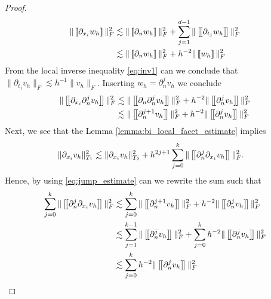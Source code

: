\begin{proof}
\begin{equation}
    \begin{split}
   \| \jump{ \partial _{x_{i}} w_{h} }   \|_{F  }^{2  } & \lesssim \| \jump{ \partial _{n} w_{h} }   \|_{F  }^{ 2 } + \sum_{j=1}^{d-1} \| \jump{ \partial _{t_{j}} w_{h} }   \|_{ F }^{ 2 } \\
    & \lesssim \| \jump{ \partial _{n} w_{h} }   \|_{F  }^{ 2 } +  h^{-2} \| \jump{ w_{h} }   \|_{ F }^{ 2 }
    \end{split}
\end{equation}
From the local inverse inequality \eqref{eq:inv1} can we conclude that $\| \partial _{t_{j}} v_{h} \|_{F  }^{  } \lesssim h^{-1} \|  v_{h} \|_{F  }^{  }  $.
Inserting $w_{h} = \partial ^{j} _{n} v_{h}$ we conclude
\begin{equation}
    \label{eq:jump_estimate}
    \begin{split}
   \| \jump{ \partial _{x_{i}} \partial ^{j} _{n} v_{h} }   \|_{F  }^{2  } & \lesssim \| \jump{ \partial _{n} \partial ^{j} _{n} v_{h} }   \|_{F  }^{ 2 } +  h^{-2} \| \jump{ \partial ^{j} _{n} v_{h} }   \|_{ F }^{ 2 } \\
                                                                           & \lesssim \| \jump{  \partial ^{j+1} _{n} v_{h} }   \|_{F  }^{ 2 } +  h^{-2} \| \jump{ \partial ^{j} _{n} v_{h} }   \|_{ F }^{ 2 } \\
    \end{split}
\end{equation}
Next, we see that the Lemma \ref{lemma:bi_local_facet_estimate} implies
\begin{equation}
    \label{eq:ghost_estimate:1}
    \begin{split}
    \| \partial _{x_{i}} v_{h} \|_{  T_{1}}^{2  } & \lesssim \| \partial _{x_{i}} v_{h} \|_{ T_{2} }^{  2} + h^{2j+1}\sum_{j=0}^{k} \| \left[\!\left[  \partial _{n}^{j} \partial _{x_{i}} v_{h}  \right]\!\right]   \|_{F  }^{2  }.
    \end{split}
\end{equation}
Hence, by using \eqref{eq:jump_estimate} can we rewrite the sum such that
\begin{equation}
    \label{eq:ghost_estimate:2}
    \begin{split}
                                                  \sum_{j=0}^{k} \| \jump{ \partial _{n}^{j} \partial _{x_{i}} v_{h} }   \|_{F  }^{2  } & \lesssim  \sum_{j=0}^{k} \| \jump{  \partial ^{j+1} _{n} v_{h} }   \|_{F  }^{ 2 } +  h^{-2} \| \jump{ \partial ^{j} _{n} v_{h} }   \|_{ F }^{ 2 } \\
                                                  & \lesssim  \sum_{j=1}^{k-1} \| \jump{  \partial ^{j} _{n} v_{h} }   \|_{F  }^{ 2 } +\sum_{j=0}^{k}  h^{-2} \| \jump{ \partial ^{j} _{n} v_{h} }   \|_{ F
                                                  }^{ 2 } \\
                                                  & \lesssim  \sum_{j=0}^{k}  h^{-2} \| \jump{ \partial ^{j} _{n} v_{h} }   \|_{ F }^{ 2 }
    \end{split}
\end{equation}


\end{proof}
